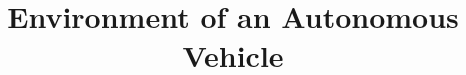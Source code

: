 \documentclass[11pt]{article}
\title{Environment of an Autonomous Vehicle}
\author{\varAuthor}
\begin{document}
\maketitle

{}

\end{document}
